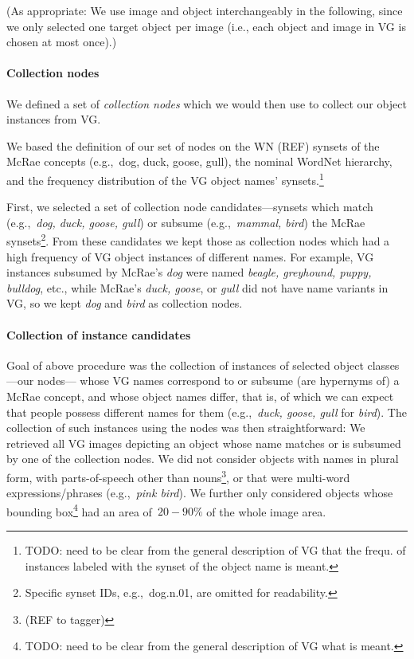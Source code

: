 (As appropriate: We use image and object interchangeably in the following, since we only selected one target object per image (i.e., each object and image in VG is chosen at most once).)

\paragraph{Collection nodes}
We defined a set of \textit{collection nodes} which we would then use to collect our object instances from VG. 

We based the definition of our set of nodes on the WN (REF) synsets of the McRae concepts (e.g.,~dog, duck, goose, gull), the nominal WordNet hierarchy, and the frequency distribution of the VG object names' synsets.\footnote{TODO: need to be clear from the general description of VG that the frequ. of instances labeled with the synset of the object name is meant.} 

First, we selected a set of collection node candidates---synsets which match (e.g.,~\textsl{dog, duck, goose, gull}) or subsume (e.g.,~\textsl{mammal, bird}) the McRae synsets\footnote{Specific synset IDs, e.g.,~dog.n.01, are omitted for readability.}. 
From these candidates we kept those as collection nodes which had a high frequency of VG object instances of different names. For example, VG instances  subsumed by McRae's \textsl{dog} were named \textsl{beagle, greyhound, puppy, bulldog}, etc., while McRae's \textsl{duck, goose}, or \textsl{gull} did not have name variants in VG, so we kept \textsl{dog} and \textsl{bird} as collection nodes.

\paragraph{Collection of instance candidates}
Goal of above procedure was the collection of instances of selected object classes---our nodes--- whose VG names correspond to or subsume (are hypernyms of) a McRae concept, and whose object names differ, that is, of which we can expect that people possess different names for them (e.g.,~\textsl{duck, goose, gull} for \textsl{bird}).
The collection of such instances using the nodes was then straightforward: We retrieved all VG images  depicting an object whose name matches or is subsumed by one of the collection nodes. 
We did not consider objects with names in plural form, with parts-of-speech other than nouns\footnote{(REF to tagger)}, or that were multi-word expressions/phrases (e.g.,~\textsl{pink bird}). 
We further only considered objects whose bounding box\footnote{TODO: need to be clear from the general description of VG what is meant.} had an area of~$20-90\%$ of the whole image area.

